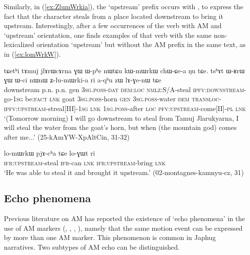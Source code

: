 Similarly, in  (\ref{ex:ZlumWrkia}), the `upstream' prefix occurs with , to express the fact that the character steals from a place located downstream to bring it upstream. Interestingly, after a few occurrences of the verb  with AM and `upstream' orientation, one finds examples of that verb with the same non-lexicalized orientation `upstream' but without the AM prefix in the same text, as in (\ref{ex:lomWrkW}).

\begin{exe}
\ex \label{ex:ZlumWrkia}
 \gll tɕetʰi tɤmuj jlɤrɯcɤrna ɣɯ ɯ-pʰe nɯtɕu kɯ-mɯrkɯ chɯ-ɕe-a ŋu tɕe. tsʰɤt ɯ-ʁrɯ ɣɯ ɯ-ci nɯnɯ ʑ-lu-mɯrki-a ri a-qʰu zɯ lɤ-ɣe-nɯ tɕe \\
 downstream p.n. p.n. gen \textsc{3sg}.\textsc{poss}-\textsc{dat} \textsc{dem}:\textsc{loc}  \textsc{nmlz}:S/A-steal  \textsc{ipfv}:\textsc{downstream}-go-\textsc{1sg} be:\textsc{fact} \textsc{lnk}  goat \textsc{3sg}.\textsc{poss}-horn \textsc{gen} \textsc{3sg}.\textsc{poss}-water \textsc{dem} \textsc{transloc}-\textsc{ipfv}:\textsc{upstream}-streal[III]-\textsc{1sg} \textsc{lnk} \textsc{1sg}.\textsc{poss}-after \textsc{loc} \textsc{pfv}:\textsc{upstream}-come[II]-\textsc{pl} \textsc{lnk}  \\
 \glt `(Tomorrow  morning) I will go downstream to steal from Tamuj Jlarukyarna, I will steal the water from the goat's horn, but when (the mountain god) comes after me...' (25-kAmYW-XpAltCin, 31-32)
\end{exe}

\begin{exe}
\ex \label{ex:lomWrkW}
 \gll lo-mɯrkɯ pjɤ-cʰa tɕe lo-ɣɯt ri \\
 \textsc{ifr}:\textsc{upstream}-steal \textsc{ifr}-can \textsc{lnk} \textsc{ifr}:\textsc{upstream}-bring \textsc{lnk} \\
\glt `He was able to steal it and brought it upstream.' (02-montagnes-kamnyu-cz, 31)
\end{exe}

\subsection{Echo phenomena} \label{sec:AM.echo}
Previous literature on AM has reported the existence of `echo phenomena' in the use of AM markers (\citealt[251]{wilkins91associated.motion}, \citealt[681-683]{vuillermet12eseejja}, \citealt[128-130]{rose15am}, \citealt[11]{guillaume16am}), namely that the same motion event can be expressed by more than one AM marker. This phenomenon is common in Japhug narratives. Two subtypes of AM echo can be distinguished.

